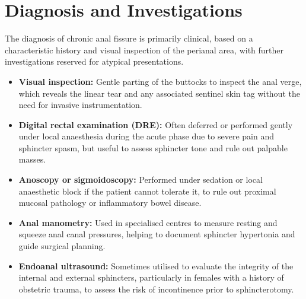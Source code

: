 \section*{Diagnosis and Investigations}
The diagnosis of chronic anal fissure is primarily clinical, based on a characteristic history and visual inspection of the perianal area, with further investigations reserved for atypical presentations.
\begin{itemize}
    \item \textbf{Visual inspection:} Gentle parting of the buttocks to inspect the anal verge, which reveals the linear tear and any associated sentinel skin tag without the need for invasive instrumentation.
    \item \textbf{Digital rectal examination (DRE):} Often deferred or performed gently under local anaesthesia during the acute phase due to severe pain and sphincter spasm, but useful to assess sphincter tone and rule out palpable masses.
    \item \textbf{Anoscopy or sigmoidoscopy:} Performed under sedation or local anaesthetic block if the patient cannot tolerate it, to rule out proximal mucosal pathology or inflammatory bowel disease.
    \item \textbf{Anal manometry:} Used in specialised centres to measure resting and squeeze anal canal pressures, helping to document sphincter hypertonia and guide surgical planning.
    \item \textbf{Endoanal ultrasound:} Sometimes utilised to evaluate the integrity of the internal and external sphincters, particularly in females with a history of obstetric trauma, to assess the risk of incontinence prior to sphincterotomy.
\end{itemize}

